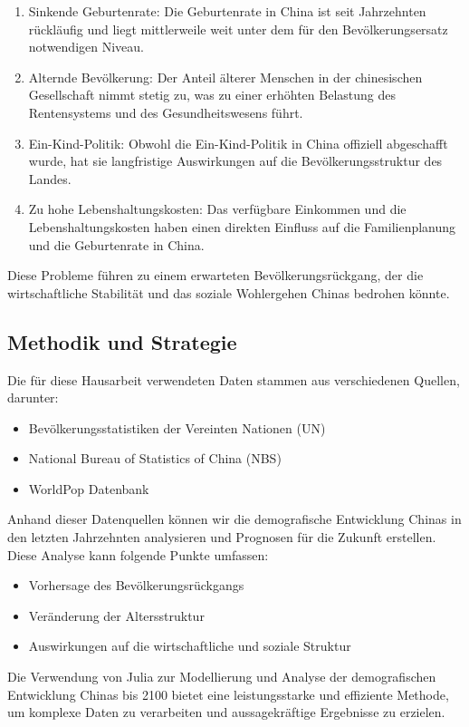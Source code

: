 \begin{enumerate}
\item Sinkende Geburtenrate: Die Geburtenrate in China ist seit Jahrzehnten rückläufig und liegt mittlerweile weit unter dem für den Bevölkerungsersatz notwendigen Niveau.
\item Alternde Bevölkerung: Der Anteil älterer Menschen in der chinesischen Gesellschaft nimmt stetig zu, was zu einer erhöhten Belastung des Rentensystems und des Gesundheitswesens führt.
\item Ein-Kind-Politik: Obwohl die Ein-Kind-Politik in China offiziell abgeschafft wurde, hat sie langfristige Auswirkungen auf die Bevölkerungsstruktur des Landes.
\item Zu hohe Lebenshaltungskosten: Das verfügbare Einkommen und die Lebenshaltungskosten haben einen direkten Einfluss auf die Familienplanung und die Geburtenrate in China.
\end{enumerate}
Diese Probleme führen zu einem erwarteten Bevölkerungsrückgang, der die wirtschaftliche Stabilität und das soziale Wohlergehen Chinas bedrohen könnte.

\subsection{Methodik und Strategie}

Die für diese Hausarbeit verwendeten Daten stammen aus verschiedenen Quellen, darunter:
\begin{itemize}
\item Bevölkerungsstatistiken der Vereinten Nationen (UN)
\item National Bureau of Statistics of China (NBS)
\item WorldPop Datenbank
\end{itemize}

Anhand dieser Datenquellen können wir die demografische Entwicklung Chinas in den letzten Jahrzehnten analysieren und Prognosen für die Zukunft erstellen.  Diese Analyse kann folgende Punkte umfassen:
\begin{itemize}
\item Vorhersage des Bevölkerungsrückgangs
\item Veränderung der Altersstruktur
\item Auswirkungen auf die wirtschaftliche und soziale Struktur
\end{itemize}
Die Verwendung von Julia zur Modellierung und Analyse der demografischen Entwicklung Chinas bis 2100 bietet eine leistungsstarke und effiziente Methode, um komplexe Daten zu verarbeiten und aussagekräftige Ergebnisse zu erzielen.